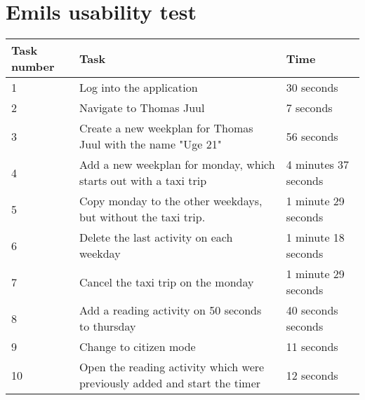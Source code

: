 \section{Emils usability test}\label{usability-test-14-05-emil}
\begin{table}[H]
    \small
    \begin{tabular}{|p{1.3cm}|p{10cm}|p{1.7cm}|}
    \hline
    Task number      &Task                                                                                                               & Time      \\ \hline
    1 & Log into the application                                                                                                             & 30 seconds  \\ \hline
    2 & Navigate to Thomas Juul                                                                                                         & 7 seconds  \\ \hline
    3 & Create a new weekplan for Thomas Juul with the name "Uge 21"                                                                    &  56 seconds \\ \hline
    4 & Add a new weekplan for monday, which starts out with a taxi trip                                                               & 4 minutes 37 seconds   \\ \hline
    5 & Copy monday to the other weekdays, but without the taxi trip.                                                                 & 1 minute 29 seconds   \\ \hline
    6 & Delete the last activity on each weekday                                                                                    & 1 minute 18 seconds   \\ \hline
    7 & Cancel the taxi trip on the monday                                                                                           & 1 minute 29 seconds  \\ \hline
    8 & Add a reading activity on 50 seconds to thursday                                                                           & 40 seconds seconds   \\ \hline
    9 & Change to citizen mode                                                                                                    & 11 seconds   \\ \hline
    10 & Open the reading activity which were previously added and start the timer                                                  & 12 seconds   \\ \hline

\end{tabular}
\end{table}
